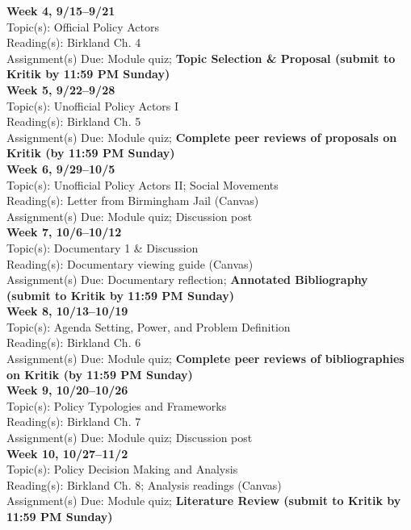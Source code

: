 \documentclass[12pt]{article}     %
\begin{document}
\noindent \textbf{Week 4, 9/15--9/21}\\
Topic(s): Official Policy Actors\\
Reading(s): Birkland Ch. 4\\
Assignment(s) Due: Module quiz; \textbf{Topic Selection \& Proposal (submit to Kritik by 11:59 PM Sunday)}\\

\noindent \textbf{Week 5, 9/22--9/28}\\
Topic(s): Unofficial Policy Actors I\\
Reading(s): Birkland Ch. 5\\
Assignment(s) Due: Module quiz; \textbf{Complete peer reviews of proposals on Kritik (by 11:59 PM Sunday)}\\

\noindent \textbf{Week 6, 9/29--10/5}\\
Topic(s): Unofficial Policy Actors II; Social Movements\\
Reading(s): Letter from Birmingham Jail (Canvas)\\
Assignment(s) Due: Module quiz; Discussion post\\

\noindent \textbf{Week 7, 10/6--10/12}\\
Topic(s): Documentary 1 \& Discussion\\
Reading(s): Documentary viewing guide (Canvas)\\
Assignment(s) Due: Documentary reflection; \textbf{Annotated Bibliography (submit to Kritik by 11:59 PM Sunday)}\\

\noindent \textbf{Week 8, 10/13--10/19}\\
Topic(s): Agenda Setting, Power, and Problem Definition\\
Reading(s): Birkland Ch. 6\\
Assignment(s) Due: Module quiz; \textbf{Complete peer reviews of bibliographies on Kritik (by 11:59 PM Sunday)}\\

\noindent \textbf{Week 9, 10/20--10/26}\\
Topic(s): Policy Typologies and Frameworks\\
Reading(s): Birkland Ch. 7\\
Assignment(s) Due: Module quiz; Discussion post\\

\noindent \textbf{Week 10, 10/27--11/2}\\
Topic(s): Policy Decision Making and Analysis\\
Reading(s): Birkland Ch. 8; Analysis readings (Canvas)\\
Assignment(s) Due: Module quiz; \textbf{Literature Review (submit to Kritik by 11:59 PM Sunday)}\\
\end{document}
